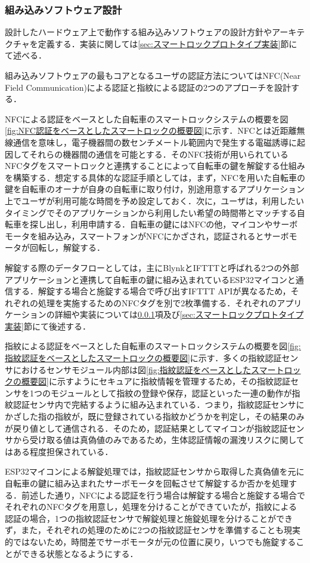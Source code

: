       \subsubsection{組み込みソフトウェア設計}
        \label{sec:組み込みソフトウェア設計}
          \par 設計したハードウェア上で動作する組み込みソフトウェアの設計方針やアーキテクチャを定義する．実装に関しては\ref{sec:スマートロックプロトタイプ実装}節にて述べる．
          \par 組み込みソフトウェアの最もコアとなるユーザの認証方法についてはNFC(Near Field Communication)による認証と指紋による認証の2つのアプローチを設計する．
          \par NFCによる認証をベースとした自転車のスマートロックシステムの概要を図\ref{fig:NFC認証をベースとしたスマートロックの概要図}に示す．NFCとは近距離無線通信を意味し，電子機器間の数センチメートル範囲内で発生する電磁誘導に起因してそれらの機器間の通信を可能とする．そのNFC技術が用いられているNFCタグをスマートロックと連携することによって自転車の鍵を解錠する仕組みを構築する．想定する具体的な認証手順としては，まず，NFCを用いた自転車の鍵を自転車のオーナが自身の自転車に取り付け，別途用意するアプリケーション上でユーザが利用可能な時間を予め設定しておく．次に，ユーザは，利用したいタイミングでそのアプリケーションから利用したい希望の時間帯とマッチする自転車を探し出し，利用申請する．自転車の鍵にはNFCの他，マイコンやサーボモータを組み込み，スマートフォンがNFCにかざされ，認証されるとサーボモータが回転し，解錠する．
          \par 解錠する際のデータフローとしては，主にBlynkとIFTTTと呼ばれる2つの外部アプリケーションと連携して自転車の鍵に組み込まれているESP32マイコンと通信する．解錠する場合と施錠する場合で呼び出すIFTTT APIが異なるため，それぞれの処理を実施するためのNFCタグを別で2枚準備する．それぞれのアプリケーションの詳細や実装については\ref{sec:組み込みソフトウェア設計}項及び\ref{sec:スマートロックプロトタイプ実装}節にて後述する．
          \par 指紋による認証をベースとした自転車のスマートロックシステムの概要を図\ref{fig:指紋認証をベースとしたスマートロックの概要図}に示す．多くの指紋認証センサにおけるセンサモジュール内部は図\ref{fig:指紋認証をベースとしたスマートロックの概要図}に示すようにセキュアに指紋情報を管理するため，その指紋認証センサを1つのモジュールとして指紋の登録や保存，認証といった一連の動作が指紋認証センサ内で完結するように組み込まれている．つまり，指紋認証センサにかざした指の指紋が，既に登録されている指紋かどうかを判定し，その結果のみが戻り値として通信される．そのため，認証結果としてマイコンが指紋認証センサから受け取る値は真偽値のみであるため，生体認証情報の漏洩リスクに関してはある程度担保されている．
          \par ESP32マイコンによる解錠処理では，指紋認証センサから取得した真偽値を元に自転車の鍵に組み込まれたサーボモータを回転させて解錠するか否かを処理する．前述した通り，NFCによる認証を行う場合は解錠する場合と施錠する場合でそれぞれのNFCタグを用意し，処理を分けることができていたが，指紋による認証の場合，1つの指紋認証センサで解錠処理と施錠処理を分けることができず，また，それぞれの処理のために2つの指紋認証センサを準備することも現実的ではないため，時間差でサーボモータが元の位置に戻り，いつでも施錠することができる状態となるようにする．

